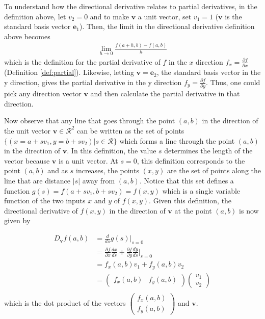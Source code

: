 \documentclass[
]{book}
\theoremstyle{definition}
\theoremstyle{definition}
\theoremstyle{definition}
\theoremstyle{remark}
\begin{document}
To understand how the directional derivative relates to partial derivatives, in the definition above, let \(v_2 = 0\) and to make \(\mathbf{v}\) a unit vector, set \(v_1 = 1\) (\(\mathbf{v}\) is the standard basis vector \(\mathbf{e}_1\)). Then, the limit in the directional derivative definition above becomes
\[
\begin{aligned}
\lim_{h \rightarrow 0} \frac{f(a + h, b) - f(a, b)}{h}
\end{aligned}
\]
which is the definition for the partial derivative of \(f\) in the \(x\) direction \(f_x = \frac{\partial f}{\partial x}\) (Definition \ref{def:partial}). Likewise, letting \(\mathbf{v} = \mathbf{e}_2\), the standard basis vector in the y direction, gives the partial derivative in the y direction \(f_y = \frac{\partial f}{\partial y}\). Thus, one could pick any direction vector \(\mathbf{v}\) and then calculate the partial derivative in that direction.

Now observe that any line that goes through the point \((a, b)\) in the direction of the unit vector \(\mathbf{v} \in \mathcal{R}^2\) can be written as the set of points \(\{(x = a + s v_1, y = b + s v_2) | s \in \mathcal{R} \}\) which forms a line through the point \((a, b)\) in the direction of \(\mathbf{v}\). In this definition, the value \(s\) determines the length of the vector because \(\mathbf{v}\) is a unit vector. At \(s=0\), this definition corresponds to the point \((a, b)\) and as \(s\) increases, the points \((x, y)\) are the set of points along the line that are distance \(|s|\) away from \((a, b)\). Notice that this set defines a function \(g(s) = f(a + s v_1, b + s v_2) = f(x, y)\) which is a single variable function of the two inputs \(x\) and \(y\) of \(f(x, y)\). Given this definition, the directional derivative of \(f(x, y)\) in the direction of \(\mathbf{v}\) at the point \((a, b)\) is now given by

\[
\begin{aligned}
D_{\mathbf{v}} f(a, b) & = \frac{d}{ds}g(s)|_{s=0} \\
& = \frac{\partial f}{\partial x} \frac{dx}{ds} + \frac{\partial f}{\partial y} \frac{dy}{ds} |_{s=0} \\
& = f_x(a, b) v_1 + f_y(a, b) v_2 \\
& = \begin{pmatrix} f_x(a, b) & f_y(a, b) \end{pmatrix} \begin{pmatrix} v_1 \\ v_2 \end{pmatrix} \\
\end{aligned}
\]
which is the dot product of the vectors \(\begin{pmatrix} f_x(a, b) \\ f_y(a, b) \end{pmatrix}\) and \(\mathbf{v}\).
\end{document}
